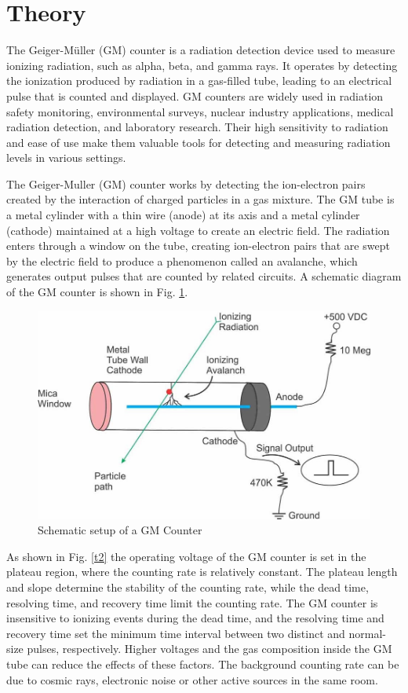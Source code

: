 \section{Theory}
The Geiger-M{\"u}ller (GM) counter is a radiation detection device used to measure ionizing radiation, such as alpha, beta, and gamma rays. It operates by detecting the ionization produced by radiation in a gas-filled tube, leading to an electrical pulse that is counted and displayed. GM counters are widely used in radiation safety monitoring, environmental surveys, nuclear industry applications, medical radiation detection, and laboratory research. Their high sensitivity to radiation and ease of use make them valuable tools for detecting and measuring radiation levels in various settings.

The Geiger-Muller (GM) counter works by detecting the ion-electron pairs created by the interaction of charged particles in a gas mixture. The GM tube is a metal cylinder with a thin wire (anode) at its axis and a metal cylinder (cathode) maintained at a high voltage to create an electric field. The radiation enters through a window on the tube, creating ion-electron pairs that are swept by the electric field to produce a phenomenon called an avalanche, which generates output pulses that are counted by related circuits. A schematic diagram of the GM counter is shown in Fig. \ref{t1}.

\begin{figure}
    \centering
    \includegraphics[width=1\columnwidth]{images/th.jpg}
    \caption{Schematic setup of a GM Counter}
    \label{t1}
\end{figure}

As shown in Fig. \ref{t2} the operating voltage of the GM counter is set in the plateau region, where the counting rate is relatively constant. The plateau length and slope determine the stability of the counting rate, while the dead time, resolving time, and recovery time limit the counting rate. The GM counter is insensitive to ionizing events during the dead time, and the resolving time and recovery time set the minimum time interval between two distinct and normal-size pulses, respectively. Higher voltages and the gas composition inside the GM tube can reduce the effects of these factors. The background counting rate can be due to cosmic rays, electronic noise or other active sources in the same room.

